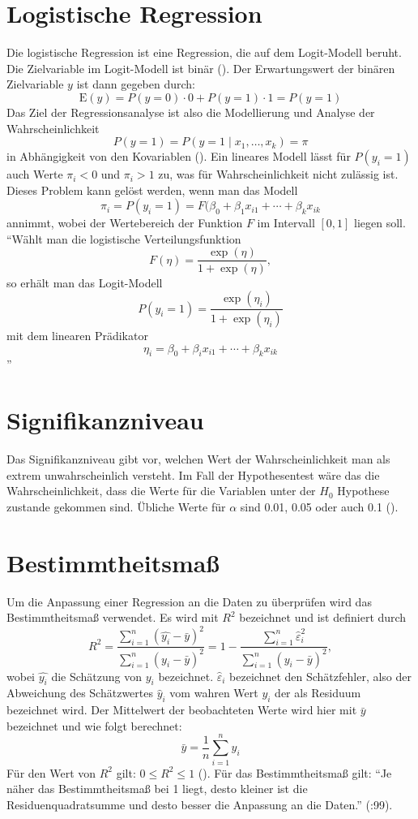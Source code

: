 \begin{appendix}
\section{Logistische Regression} \label{append:LogReg}
Die logistische Regression ist eine Regression, die auf dem Logit-Modell beruht. Die Zielvariable im Logit-Modell ist binär (\cite{Fahrmeir.2009}).
Der Erwartungswert der binären Zielvariable $y$ ist dann gegeben durch:
$$\text{E}(y) = P(y=0) \cdot 0 + P(y=1) \cdot 1 = P(y=1)$$
Das Ziel der Regressionsanalyse ist also die Modellierung und Analyse der Wahrscheinlichkeit
$$P(y=1) = P(y=1 \mid x_1, \ldots, x_k) = \pi$$ 
in Abhängigkeit von den Kovariablen (\cite{Fahrmeir.2009}).
Ein lineares Modell lässt für $P(y_i=1)$ auch Werte $\pi_i < 0$ und $\pi_i > 1$ zu, was für Wahrscheinlichkeit nicht zulässig ist.
Dieses Problem kann gelöst werden, wenn man das Modell 
$$ \pi_i = P(y_i=1) = F(\beta_0 + \beta_1x_{i1} + \cdots + \beta_kx_{ik}$$
annimmt, wobei der Wertebereich der Funktion $F$ im Intervall $[0, 1]$ liegen soll. "`Wählt man die logistische Verteilungsfunktion 
$$F(\eta) = \frac{\exp(\eta)}{1+\exp(\eta)},$$
so erhält man das Logit-Modell
$$P(y_i = 1) = \frac{\exp(\eta_i)}{1+\exp(\eta_i)} $$
mit dem linearen Prädikator
$$\eta_i = \beta_0 + \beta_ix_{i1} + \cdots + \beta_kx_{ik}$$"'
\cite{Fahrmeir.2009} \\
\section{Signifikanzniveau} \label{append:Signifikanzniveau}
Das Signifikanzniveau gibt vor, welchen Wert der Wahrscheinlichkeit man als extrem unwahrscheinlich versteht. Im Fall der Hypothesentest wäre das die Wahrscheinlichkeit, dass die Werte für die Variablen unter der $H_0$ Hypothese zustande gekommen sind. Übliche Werte für $\alpha$ sind 0.01, 0.05 oder auch 0.1 (\cite{Fahrmeir.2011}).
\section{Bestimmtheitsmaß} \label{append:rsquared}
Um die Anpassung einer Regression an die Daten zu überprüfen wird das Bestimmtheitsmaß verwendet. Es wird mit $R^2$ bezeichnet und ist definiert durch
\begin{equation}
R^2 = 
\frac{\sum_{i=1}^{n}(\hat{y_i}-\bar{y})^2}{\sum_{i=1}^{n}(y_i-\bar{y})^2} = 1- \frac{\sum_{i=1}^n \hat{\varepsilon}_i^2}{\sum_{i=1}^{n}(y_i-\bar{y})^2},
\end{equation}
wobei $\hat{y_i}$ die Schätzung von $y_i$ bezeichnet. $\hat{\varepsilon}_i$ bezeichnet den Schätzfehler, also der Abweichung des Schätzwertes $\hat{y}_i$ vom wahren Wert $y_i$ der als Residuum bezeichnet wird. Der Mittelwert der beobachteten Werte wird hier mit $\bar{y}$ bezeichnet und wie folgt berechnet:
$$ \bar{y} =\frac{1}{n} \sum_{i=1}^n y_i $$ 
Für den Wert von $R^2$ gilt: $0 \leq R^2 \leq 1$ (\cite{Fahrmeir.2009}). Für das Bestimmtheitsmaß gilt: "`Je näher das Bestimmtheitsmaß bei 1 liegt, desto kleiner ist die Residuenquadratsumme und desto besser die Anpassung an die Daten."' (\cite{Fahrmeir.2009}:99).

\end{appendix}
